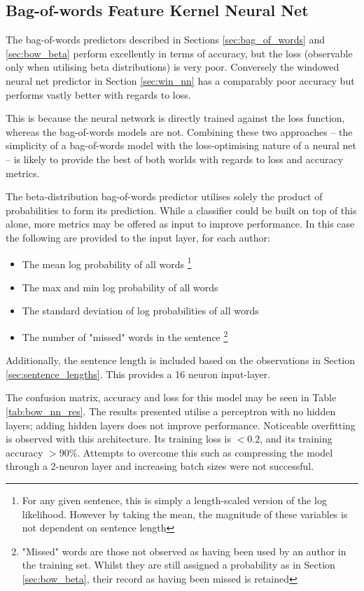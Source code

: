    \subsection{Bag-of-words Feature Kernel Neural Net}
  \label{sec:bow_nn}
  The bag-of-words predictors described in Sections \ref{sec:bag_of_words} and \ref{sec:bow_beta} perform excellently in terms of accuracy, but the loss (observable only when utilising beta distributions) is very poor. Conversely the windowed neural net predictor in Section \ref{sec:win_nn} has a comparably poor accuracy but performs vastly better with regards to loss.
  
  This is because the neural network is directly trained against the loss function, whereas the bag-of-words models are not. Combining these two approaches -- the simplicity of a bag-of-words model with the loss-optimising nature of a neural net -- is likely to provide the best of both worlds with regards to loss and accuracy metrics.
  
  The beta-distribution bag-of-words predictor utilises solely the product of probabilities to form its prediction. While a classifier could be built on top of this alone, more metrics may be offered as input to improve performance. In this case the following are provided to the input layer, for each author:
  
  \begin{itemize}
  \item The mean log probability of all words \footnote{For any given sentence, this is simply a length-scaled version of the log likelihood. However by taking the mean, the magnitude of these variables is not dependent on sentence length}
  \item The max and min log probability of all words
  \item The standard deviation of log probabilities of all words
  \item The number of "missed" words in the sentence \footnote{"Missed" words are those not observed as having been used by an author in the training set. Whilst they are still assigned a probability as in Section \ref{sec:bow_beta}, their record as having been missed is retained}
  \end{itemize}
  
 Additionally, the sentence length is included based on the observations in Section \ref{sec:sentence_lengths}. This provides a 16 neuron input-layer.
 
 The confusion matrix, accuracy and loss for this model may be seen in Table \ref{tab:bow_nn_res}. The results presented utilise a perceptron with no hidden layers; adding hidden layers does not improve performance. Noticeable overfitting is observed with this architecture. Its training loss is $<0.2$, and its training accuracy $>90\%$. Attempts to overcome this such as compressing the model through a 2-neuron layer and increasing batch sizes were not successful.
  
